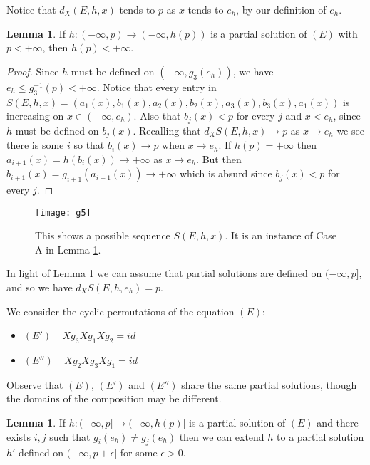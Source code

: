 \documentclass[12pt]{article}
\theoremstyle{definition}
\newtheorem{lem}[thm]{Lemma}
\begin{document}
Notice that $d_X(E,h,x)$ tends to $p$ as $x$ tends to $e_h$, by our definition of $e_h$.




\begin{lem} \label{acotadas} If $h:(-\infty,p)\to(-\infty,h(p))$ is a partial solution of $(E)$ with $p<+\infty$, then $h(p)<+\infty$. 
\end{lem}

\begin{proof}
Since $h$ must be defined on $(-\infty,g_3(e_h))$, we have $e_h\leq g_3^{-1}(p)<+\infty$. Notice that every entry in $S(E,h,x)=(a_1(x),b_1(x),a_2(x),b_2(x),a_3(x),b_3(x),a_1(x))$ is increasing on $x\in(-\infty,e_h)$. Also that $b_j(x)<p$ for every $j$ and $x<e_h$, since $h$ must be defined on $b_j(x)$. Recalling that  $d_XS(E,h,x)\to p$ as $x\to e_h$ we see there is some $i$ so that $b_i(x)\to p$ when $x\to e_h$. If $h(p)=+\infty$ then $a_{i+1}(x)=h(b_i(x))\to +\infty$ as $x\to e_h$. But then $b_{i+1}(x)=g_{i+1}(a_{i+1}(x))\to+\infty$ which is absurd since $b_j(x)<p$ for every $j$.


\end{proof}

\begin{figure}[h!] 
\texttt{[image: g5]}
\caption{This shows a possible sequence $S(E,h,x)$. It is an instance of Case A in Lemma \ref{extension}.}
\label{f5}
\end{figure}

In light of Lemma \ref{acotadas} we can assume that partial solutions are defined on $(-\infty,p]$, and so we have $d_XS(E,h,e_h)=p$.

We consider the cyclic permutations of the equation $(E)$:
\begin{itemize} 
\item $(E')$ $\ \ $ $Xg_3Xg_1Xg_2=id$
\item $(E'')$ $\ \ $ $Xg_2Xg_3Xg_1=id$
\end{itemize}

Observe that $(E)$, $(E')$ and $(E'')$ share the same partial solutions, though the domains of the composition may be different.
 
\begin{lem}\label{extension}If $h:(-\infty,p]\to(-\infty,h(p)]$ is a partial solution of $(E)$ and there exists $i,j$ such that $g_i(e_h)\neq g_j(e_h)$ then we can extend $h$ to a partial solution $h'$ defined on $(-\infty,p+\epsilon]$ for some $\epsilon>0$.
\end{lem}
\end{document}

